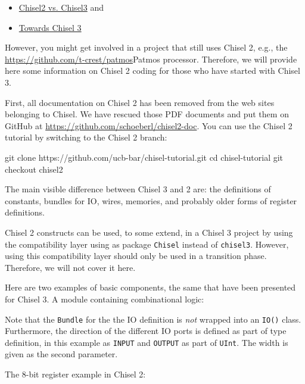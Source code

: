 \documentclass[%
    11pt, %
    headinclude, footexclude,
    openright, %
    notitlepage,
    cleardoubleempty,
    headsepline,
    pointlessnumbers,
    bibtotoc, idxtotoc,
    ]{scrbook}
\newcommand{\code}[1]{{\small{\texttt{#1}}}}
\begin{document}
\begin{itemize}
\item \href{https://github.com/freechipsproject/chisel3/wiki/Chisel3-vs-Chisel2}{Chisel2 vs. Chisel3} and
\item \href{https://github.com/schoeberl/chisel-examples/blob/master/TowardsChisel3.md}{Towards Chisel 3}
\end{itemize}

However, you might get involved in a project that still uses Chisel 2,
e.g., the \url{https://github.com/t-crest/patmos}{Patmos} processor.
Therefore, we will provide here some information on Chisel 2 coding for those who
have started with Chisel 3.

First, all documentation on Chisel 2 has been removed from the web sites
belonging to Chisel. We have rescued those PDF documents and put them
on GitHub at \url{https://github.com/schoeberl/chisel2-doc}.
You can use the Chisel 2 tutorial by switching to the Chisel 2 branch:

\begin{chisel}
git clone https://github.com/ucb-bar/chisel-tutorial.git
cd chisel-tutorial
git checkout chisel2
\end{chisel}

The main visible difference between Chisel 3 and 2 are: the definitions of
constants, bundles for IO, wires, memories, and probably older forms of register
definitions.

Chisel 2 constructs can be used, to some extend, in a Chisel 3 project by
using the compatibility layer using as package \code{Chisel} instead of \code{chisel3}.
However, using this compatibility layer should only be used in a transition phase.
Therefore, we will not cover it here.

Here are two examples of basic components, the same that have been presented
for Chisel 3. A module containing combinational logic:



Note that the \code{Bundle} for the the IO definition is \emph{not} wrapped into
an \code{IO()} class.  Furthermore, the direction of the different IO ports is defined
as part of type definition, in this example as \code{INPUT} and \code{OUTPUT}
as part of \code{UInt}. The width is given as the second parameter.

\begin{minipage}{\linewidth}
The 8-bit register example in Chisel 2:


\end{minipage}
\end{document}
